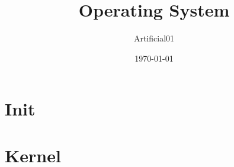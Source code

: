 \documentclass{article}
\title{Operating System}
\author{Artificial01}
\date{\today}
\begin{document}
	\maketitle
	\newpage
	
	\tableofcontents
	\newpage
	
	
	\section{Init}
	
	\newpage
	
	
	\section{Kernel}
	
	\newpage
	
\end{document}

